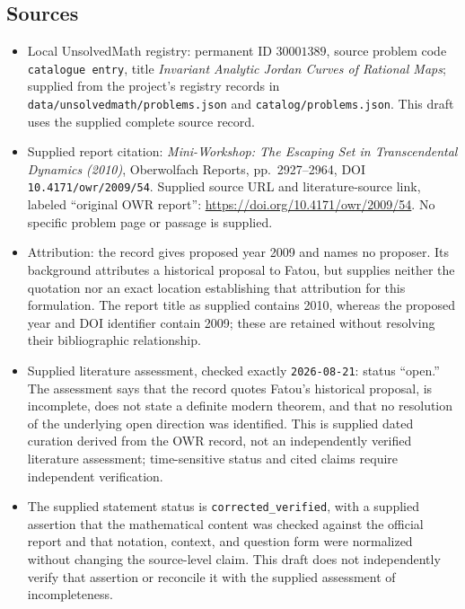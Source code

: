 \documentclass[11pt]{article}
\begin{document}
\subsection{Sources}
\begin{itemize}
\item Local UnsolvedMath registry: permanent ID \(30001389\), source problem code \texttt{catalogue entry}, title \emph{Invariant Analytic Jordan Curves of Rational Maps}; supplied from the project's registry records in \texttt{data/unsolvedmath/problems.json} and \texttt{catalog/problems.json}. This draft uses the supplied complete source record.
\item Supplied report citation: \emph{Mini-Workshop: The Escaping Set in Transcendental Dynamics (2010)}, Oberwolfach Reports, pp.~2927--2964, DOI \texttt{10.4171/owr/2009/54}. Supplied source URL and literature-source link, labeled ``original OWR report'': \url{https://doi.org/10.4171/owr/2009/54}. No specific problem page or passage is supplied.
\item Attribution: the record gives proposed year 2009 and names no proposer. Its background attributes a historical proposal to Fatou, but supplies neither the quotation nor an exact location establishing that attribution for this formulation. The report title as supplied contains 2010, whereas the proposed year and DOI identifier contain 2009; these are retained without resolving their bibliographic relationship.
\item Supplied literature assessment, checked exactly \texttt{2026-08-21}: status ``open.'' The assessment says that the record quotes Fatou's historical proposal, is incomplete, does not state a definite modern theorem, and that no resolution of the underlying open direction was identified. This is supplied dated curation derived from the OWR record, not an independently verified literature assessment; time-sensitive status and cited claims require independent verification.
\item The supplied statement status is \texttt{corrected\_verified}, with a supplied assertion that the mathematical content was checked against the official report and that notation, context, and question form were normalized without changing the source-level claim. This draft does not independently verify that assertion or reconcile it with the supplied assessment of incompleteness.
\end{itemize}
\end{document}
